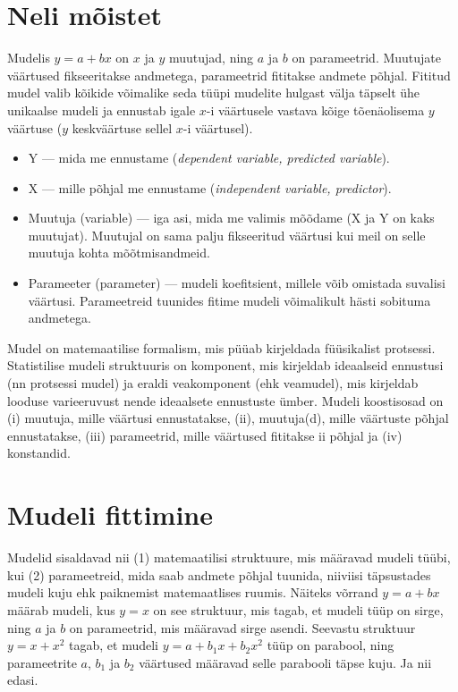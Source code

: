\documentclass[]{book}
\begin{document}
\hypertarget{neli-moistet}{%
\section{Neli mõistet}\label{neli-moistet}}

Mudelis \(y = a + bx\) on \(x\) ja \(y\) muutujad, ning \(a\) ja \(b\) on parameetrid.
Muutujate väärtused fikseeritakse andmetega, parameetrid fititakse andmete põhjal.
Fititud mudel valib kõikide võimalike seda tüüpi mudelite hulgast välja täpselt ühe unikaalse mudeli ja ennustab igale \(x\)-i väärtusele vastava kõige tõenäolisema \(y\) väärtuse (\(y\) keskväärtuse sellel \(x\)-i väärtusel).

\begin{itemize}
\item
  Y --- mida me ennustame (\emph{dependent variable, predicted variable}).
\item
  X --- mille põhjal me ennustame (\emph{independent variable, predictor}).
\item
  Muutuja (variable) --- iga asi, mida me valimis mõõdame (X ja Y on kaks muutujat). Muutujal on sama palju fikseeritud väärtusi kui meil on selle muutuja kohta mõõtmisandmeid.
\item
  Parameeter (parameter) --- mudeli koefitsient, millele võib omistada suvalisi väärtusi. Parameetreid tuunides fitime mudeli võimalikult hästi sobituma andmetega.
\end{itemize}

Mudel on matemaatilise formalism, mis püüab kirjeldada füüsikalist protsessi.
Statistilise mudeli struktuuris on komponent, mis kirjeldab ideaalseid ennustusi (nn protsessi mudel) ja eraldi veakomponent (ehk veamudel), mis kirjeldab looduse varieeruvust nende ideaalsete ennustuste ümber. Mudeli koostisosad on (i) muutuja, mille väärtusi ennustatakse, (ii), muutuja(d), mille väärtuste põhjal ennustatakse, (iii) parameetrid, mille väärtused fititakse ii põhjal ja (iv) konstandid.

\hypertarget{mudeli-fittimine}{%
\section{Mudeli fittimine}\label{mudeli-fittimine}}

Mudelid sisaldavad nii (1) matemaatilisi struktuure, mis määravad mudeli tüübi, kui (2) parameetreid, mida saab andmete põhjal tuunida, niiviisi täpsustades mudeli kuju ehk paiknemist matemaatlises ruumis.
Näiteks võrrand \(y = a + bx\) määrab mudeli, kus \(y = x\) on see struktuur, mis tagab, et mudeli tüüp on sirge, ning \(a\) ja \(b\) on parameetrid, mis määravad sirge asendi.
Seevastu struktuur \(y = x + x^2\) tagab, et mudeli \(y = a + b_1x + b_2x^2\) tüüp on parabool, ning parameetrite \(a\), \(b_1\) ja \(b_2\) väärtused määravad selle parabooli täpse kuju. Ja nii edasi.
\end{document}
